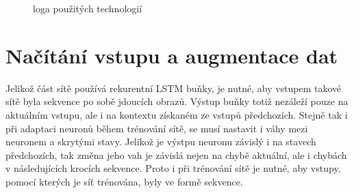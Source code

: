 \begin{figure}[h!]
	\centering
	\hspace{0.2\textwidth}
	\caption{loga použitých technologií}
	\label{fig:logos}
\end{figure}

\section{Načítání vstupu a augmentace dat}
Jelikož část sítě používá rekurentní LSTM buňky, je nutné, aby vstupem takové sítě byla sekvence po sobě jdoucích obrazů.
Výstup buňky totiž nezáleží pouze na aktuálním vstupu, ale i na kontextu získaném ze vstupů předchozích.
Stejně tak i při adaptaci neuronů během trénování sítě, se musí nastavit i váhy mezi neuronem a skrytými stavy.
Jelikož je výstpu neuronu závislý i na stavech předchozích, tak změna jeho vah je závislá nejen na chybě aktuální, ale i chybách v následujících krocích sekvence.
Proto i při trénování sítě je nutné, aby vstupy, pomocí kterých je síť trénována, byly ve formě sekvence.





\endinput